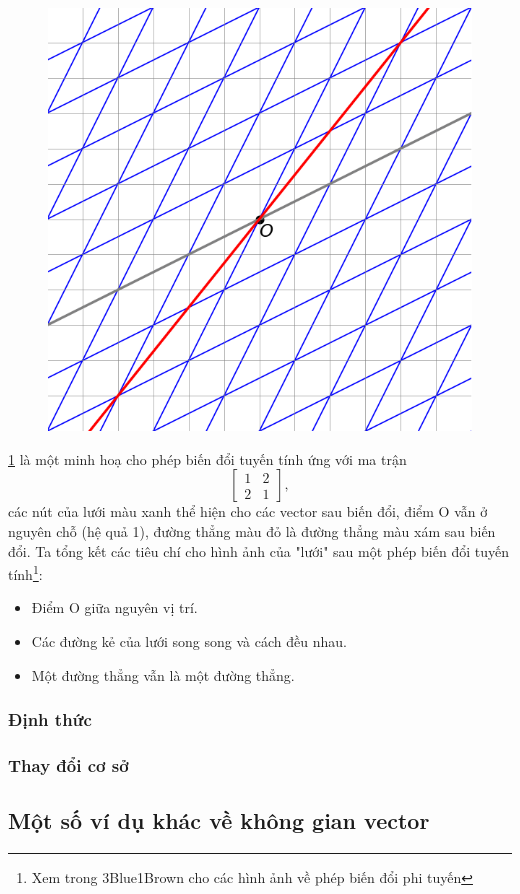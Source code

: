 \begin{figure}[H]
    \centering
    \includegraphics[width=0.6\linewidth]{Tuan2/Figures/LT1.png}
    \label{LT1}
\end{figure}
\ref{LT1} là một minh hoạ cho phép biến đổi tuyến tính ứng với ma trận \[\begin{bmatrix}
    1&2\\2&1
\end{bmatrix},\] các nút của lưới màu xanh thể hiện cho các vector sau biến đổi, điểm O vẫn ở nguyên chỗ (hệ quả 1), đường thẳng màu đỏ là đường thẳng màu xám sau biến đổi.
Ta tổng kết các tiêu chí cho hình ảnh của "lưới" sau một phép biến đổi tuyến tính\footnote{Xem trong 3Blue1Brown cho các hình ảnh về phép biến đổi phi tuyến}:
\begin{itemize}
    \item Điểm O giữa nguyên vị trí.
    \item Các đường kẻ của lưới song song và cách đều nhau.
    \item Một đường thẳng vẫn là một đường thẳng.
\end{itemize}


\subsubsection*{Định thức}
\subsubsection*{Thay đổi cơ sở}
\subsection{Một số ví dụ khác về không gian vector}\label{morexample}


